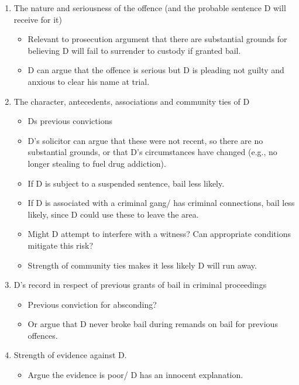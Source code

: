 \documentclass[
]{article}
\providecommand{\tightlist}{%
  \setlength{\itemsep}{0pt}\setlength{\parskip}{0pt}}
\begin{document}
\begin{enumerate}
\def\labelenumi{\arabic{enumi}.}
\tightlist
\item
  The nature and seriousness of the offence (and the probable sentence D
  will receive for it)

  \begin{itemize}
  \tightlist
  \item
    Relevant to prosecution argument that there are substantial grounds
    for believing D will fail to surrender to custody if granted bail.
  \item
    D can argue that the offence is serious but D is pleading not guilty
    and anxious to clear his name at trial.
  \end{itemize}
\item
  The character, antecedents, associations and community ties of D

  \begin{itemize}
  \tightlist
  \item
    Ds previous convictions
  \item
    D's solicitor can argue that these were not recent, so there are no
    substantial grounds, or that D's circumstances have changed (e.g.,
    no longer stealing to fuel drug addiction).
  \item
    If D is subject to a suspended sentence, bail less likely.
  \item
    If D is associated with a criminal gang/ has criminal connections,
    bail less likely, since D could use these to leave the area.
  \item
    Might D attempt to interfere with a witness? Can appropriate
    conditions mitigate this risk?
  \item
    Strength of community ties makes it less likely D will run away.
  \end{itemize}
\item
  D's record in respect of previous grants of bail in criminal
  proceedings

  \begin{itemize}
  \tightlist
  \item
    Previous conviction for absconding?
  \item
    Or argue that D never broke bail during remands on bail for previous
    offences.
  \end{itemize}
\item
  Strength of evidence against D.

  \begin{itemize}
  \tightlist
  \item
    Argue the evidence is poor/ D has an innocent explanation.
  \end{itemize}
\end{enumerate}
\end{document}
